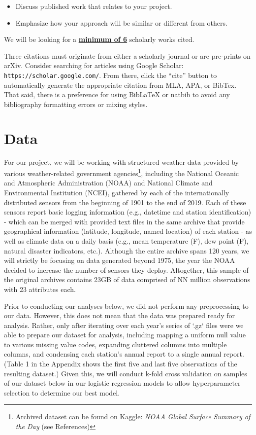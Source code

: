 \documentclass[conference]{IEEEtran}
\begin{document}
\begin{itemize}
  \item Discuss published work that relates to your project.
  \item Emphasize how your approach will be similar or different from others.
\end{itemize}

We will be looking for a \textbf{\underline{minimum of 6}} scholarly works cited.

Three citations must originate from either a scholarly journal or are pre-prints on arXiv. Consider searching for articles using Google Scholar: \texttt{https://scholar.google.com/}. From there, click the “cite” button to automatically generate the appropriate citation from MLA, APA, or BibTex. That said, there is a preference for using BibLaTeX or natbib to avoid any bibliography formatting errors or mixing styles.

\section{Data}
  
For our project, we will be working with structured weather data provided by various weather-related government agencies\footnote{Archived dataset can be found on Kaggle: \textit{NOAA Global Surface Summary of the Day} (see References)}, including the National Oceanic and Atmospheric Administration (NOAA) and National Climate and Environmental Institution (NCEI), gathered by each of the internationally distributed sensors from the beginning of 1901 to the end of 2019. Each of these sensors report basic logging information (e.g., datetime and station identification) - which can be merged with provided text files in the same archive that provide geographical information (latitude, longitude, named location) of each station - as well as climate data on a daily basis (e.g., mean temperature (F), dew point (F), natural disaster indicators, etc.). Although the entire archive spans 120 years, we will strictly be focusing on data generated beyond 1975, the year the NOAA decided to increase the number of sensors they deploy. Altogether, this sample of the original archives contains 23GB of data comprised of NN million observations with 23 attributes each.

Prior to conducting our analyses below, we did not perform any preprocessing to our data. However, this does not mean that the data was prepared ready for analysis. Rather, only after iterating over each year's series of `.gz` files were we able to prepare our dataset for analysis, including mapping a uniform null value to various missing value codes, expanding cluttered columns into multiple columns, and condensing each station's annual report to a single annual report. (Table 1 in the Appendix shows the first five and last five observations of the resulting dataset.) Given this, we will conduct k-fold cross validation on samples of our dataset below in our logistic regression models to allow hyperparameter selection to determine our best model.
\end{document}
